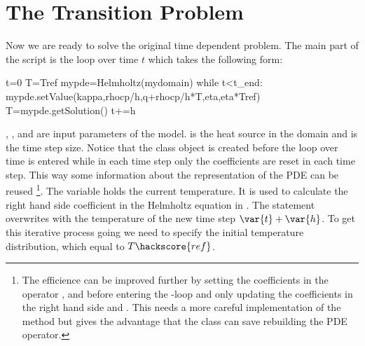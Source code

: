 \section{The Transition Problem}
\label{DIFFUSION TRANS SEC}
Now we are ready to solve the original time dependent problem. The main 
part of the script is the loop over time $t$ which takes the following form:
\begin{python}
t=0
T=Tref
mypde=Helmholtz(mydomain)
while t<t_end:
      mypde.setValue(kappa,rhocp/h,q+rhocp/h*T,eta,eta*Tref)
      T=mypde.getSolution()
      t+=h
\end{python}
, ,  and  are input parameters of the model.  is the heat source
in the domain and  is the time step size. Notice that the  class object 
is created before the loop over time is entered while in each time step only the coefficients
are reset in each time step. This way some information about the representation of the PDE can be reused 
\footnote{The efficience can be improved further by setting the coefficients in the operator
,  and  before entering the -loop and only updating the coefficients
in the right hand side  and . This needs a more careful implementation of the 
method but gives the advantage that the \LinearPDE class can save rebuilding the PDE operator.}. The variable 
holds the current temperature. It is used to calculate the right hand side coefficient  in the
Helmholtz equation in . The statement  overwrites  with the 
temperature of the new time step $\var{t}+\var{h}$. To get this iterative process going we need to specify the
initial temperature distribution, which equal to $T\hackscore{ref}$.


